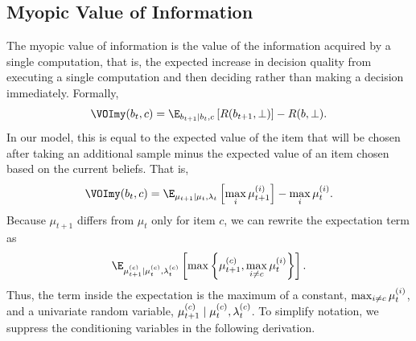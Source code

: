 \subsection{Myopic Value of Information}
The myopic value of information is the value of the information acquired by a single computation, that is, the expected increase in decision quality from executing a single computation and then deciding rather than making a decision immediately. Formally,
%
%
\begin{equation*}
  \VOImy(b_t,c) = \E_{b_{t+1} \mid b_t, c}\left[
    R(b_{t+1},\bot)
  \right] - R(b, \bot).
\end{equation*}
%
In our model, this is equal to the expected value of the item that will be chosen after taking an additional sample minus the expected value of an item chosen based on the current beliefs. That is,
%
%
\begin{equation*}
  \VOImy(b_t, c) = \E_{\mu_{t+1} \mid \mu_t, \lambda_t} \left[
    \max_i \mu_{t+1}^{(i)}
\right] - \max_i \mu_t^{(i)}.
\end{equation*}
%
Because $\mu_{t+1}$ differs from $\mu_t$ only for item $c$, we can rewrite the expectation term as
%
\begin{equation}
  \label{eq:myopicmax}
  \E_{\postmean \mid \currentmean, \currentlam} \left[ 
    \max \left\{ \postmean,\nextbest \right\} 
  \right].
\end{equation}
%
Thus, the term inside the expectation is the maximum of a constant, $\max_{i \neq c} \mu_t^{(i)}$, and a univariate random variable, $\mu_{t+1}^{(c)} \mid \mu_{t}^{(c)}, \lambda_{t}^{(c)}$. To simplify notation, we suppress the conditioning variables in the following derivation.

